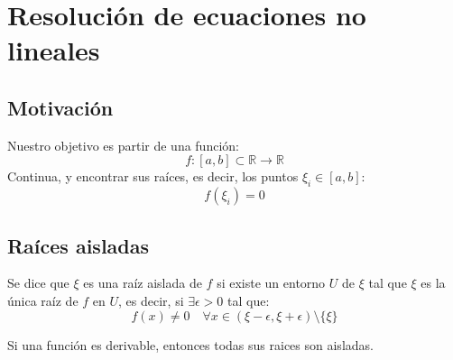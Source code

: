\section{Resolución de ecuaciones no lineales}

\subsection{Motivación}
Nuestro objetivo es partir de una función:
\[
    f: [a,b]\subset\mathbb{R}\to\mathbb{R}
\]
Continua, y encontrar sus raíces, es decir, los puntos $\xi_i \in [a,b]$:
\[
    f(\xi_i) = 0
\]

\subsection{Raíces aisladas}

\begin{definición}
    Se dice que $\xi$ es una raíz aislada de $f$ si existe un entorno $U$ de $\xi$ tal que $\xi$ es la única raíz de $f$ en $U$, es decir, si $\exists \epsilon > 0$ tal que:
    \[
        f(x) \neq 0 \quad \forall x \in ( \xi - \epsilon, \xi + \epsilon ) \setminus \{ \xi \}
    \]   
\end{definición}

\begin{observación}
    Si una función es derivable, entonces todas sus raices son aisladas.
\end{observación}

